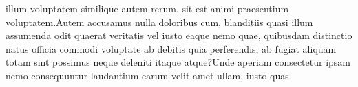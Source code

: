 \documentclass[letterpaper]{article} %
\begin{document}
illum voluptatem similique autem rerum, sit est animi praesentium voluptatem.Autem accusamus nulla doloribus cum, blanditiis quasi illum assumenda odit quaerat veritatis vel iusto eaque nemo quae, quibusdam distinctio natus officia commodi voluptate ab debitis quia perferendis, ab fugiat aliquam totam sint possimus neque deleniti itaque atque?Unde aperiam consectetur ipsam nemo consequuntur laudantium earum velit amet ullam, iusto quas


\end{document}
